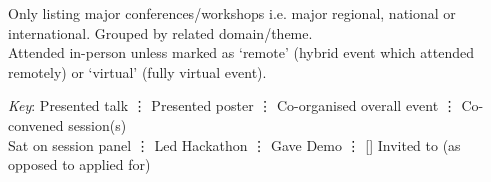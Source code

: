 
\hspace{3 mm}Only listing major conferences/workshops i.e. major regional, national or international. Grouped by related domain/theme.\\\hspace*{3 mm}Attended in-person unless marked as `remote' (hybrid event which attended remotely) or `virtual' (fully virtual event).

\hspace{2mm} \textit{Key}: \hspace{1mm}
\faCommentingO \hspace{1mm} Presented talk \hspace{1mm} \vdots \hspace{1mm}
\faNewspaperO \hspace{1mm} Presented poster \hspace{1mm} \vdots \hspace{1mm}
\faClipboard \hspace{1mm} Co-organised overall event \hspace{1mm} \vdots \hspace{1mm} \faBriefcase \hspace{1mm} Co-convened session(s) \\
\hspace*{11mm}
\faGroup \hspace{1mm} Sat on session panel \hspace{1mm} \vdots \hspace{1mm}
\faCode \hspace{1mm} Led Hackathon \hspace{1mm} \vdots \hspace{1mm}
\faWrench \hspace{1mm} Gave Demo \hspace{1mm} \vdots \hspace{1mm}
[\faEnvelopeO] \hspace{1mm} Invited to (as opposed to applied for)

